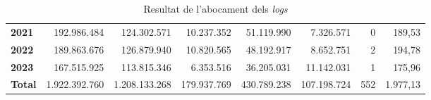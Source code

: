 \begin{table}[h!]
\begin{adjustbox}{width=1.5\textwidth, center}
\begin{tabular}{|l|r|r|r|r|r|r|r|}
        \textbf{2021}       & 192.986.484           & 124.302.571           & 10.237.352                & 51.119.990            & 7.326.571                 & 0             & 189,53        \\
        \textbf{2022}       & 189.863.676           & 126.879.940           & 10.820.565                & 48.192.917            & 8.652.751                 & 2             & 194,78        \\
        \textbf{2023}       & 167.515.925           & 113.815.346           & 6.353.516                 & 36.205.031            & 11.142.031                & 1             & 175,96        \\
        \midrule
        \textbf{Total}      & 1.922.392.760         & 1.208.133.268         & 179.937.769               & 430.789.238           & 107.198.724               & 552           & 1.977,13      \\
        \bottomrule
    \end{tabular}
    \end{adjustbox}
    \caption{Resultat de l'abocament dels \textit{logs}}
    \label{tab:logs-table}
\end{table}
